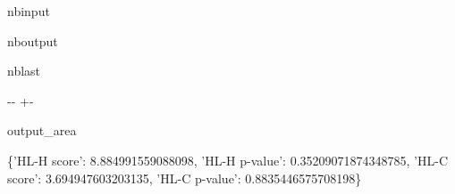 \documentclass[letterpaper,10pt,english]{sphinxmanual}
\begin{document}
\begin{sphinxuseclass}{nbinput}
{
\begin{sphinxVerbatim}[commandchars=\\\{\}]
\llap{\color{nbsphinxin}[3]:\,\hspace{\fboxrule}\hspace{\fboxsep}}
   
  
  \PYG{p}{[} \PYG{p}{]}
\end{sphinxVerbatim}
}

\end{sphinxuseclass}
\begin{sphinxuseclass}{nboutput}
\begin{sphinxuseclass}{nblast}
{

\kern-\sphinxverbatimsmallskipamount\kern-\baselineskip
\kern+\FrameHeightAdjust\kern-\fboxrule
\vspace{\nbsphinxcodecellspacing}

\begin{sphinxuseclass}{output_area}
\begin{sphinxuseclass}{}


\begin{sphinxVerbatim}[commandchars=\\\{\}]
\llap{\color{nbsphinxout}[3]:\,\hspace{\fboxrule}\hspace{\fboxsep}}\{'HL-H score': 8.884991559088098,
 'HL-H p-value': 0.35209071874348785,
 'HL-C score': 3.694947603203135,
 'HL-C p-value': 0.8835446575708198\}
\end{sphinxVerbatim}



\end{sphinxuseclass}
\end{sphinxuseclass}
}

\end{sphinxuseclass}
\end{sphinxuseclass}
\end{document}
